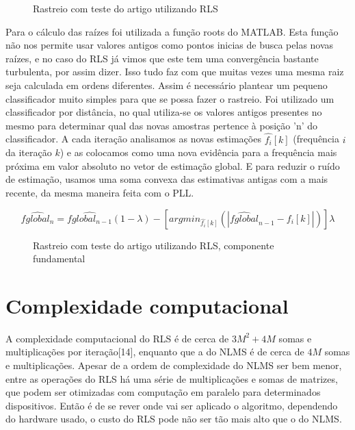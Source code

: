 \begin{figure}[H]
	\centering    
	\def\svgwidth{\columnwidth}
	
	\caption{Rastreio com teste do artigo utilizando RLS}
	\label{fig:rastreio_final}
\end{figure}


Para o cálculo das raízes foi utilizada a função roots do MATLAB. Esta função não nos permite usar valores antigos como pontos inicias de busca pelas novas raízes, e no caso do RLS já vimos que este tem uma convergência bastante turbulenta, por assim dizer. Isso tudo faz com que muitas vezes uma mesma raiz seja calculada em ordens diferentes. Assim é necessário plantear um pequeno classificador muito simples para que se possa fazer o rastreio. Foi utilizado um classificador por distância, no qual utiliza-se os valores antigos presentes no mesmo para determinar qual das novas amostras pertence à posição 'n' do classificador. A cada iteração analisamos as novas estimações $\hat{f_i}[k]$ (frequência $i$ da iteração $k$) e as colocamos como uma nova evidência para a frequência mais próxima em valor absoluto no vetor de estimação global. E para reduzir o ruído de estimação, usamos uma soma convexa das estimativas antigas com a mais recente, da mesma maneira feita com o PLL.

\begin{equation}
	\hat{fglobal_n}=\hat{fglobal_{n-1}}(1-\lambda)-[argmin_{\hat{f_i}[k]}(|\hat{fglobal}_{n-1}-f_i[k]|)]\lambda
\end{equation}

\begin{figure}[H]
	\centering    
	\def\svgwidth{\columnwidth}
	
	\caption{Rastreio com teste do artigo utilizando RLS, componente fundamental}
	\label{fig:rastreio_final}
\end{figure}

\section{Complexidade computacional}

A complexidade computacional do RLS é de cerca de $3M^2 + 4M$ somas e multiplicações por iteração[14], enquanto que a do NLMS é de cerca de $4M$ somas e multiplicações. Apesar de a ordem de complexidade do NLMS ser bem menor, entre as operações do RLS há uma série de multiplicações e somas de matrizes, que podem ser otimizadas com computação em paralelo para determinados dispositivos. Então é de se rever onde vai ser aplicado o algoritmo, dependendo do hardware usado, o custo do RLS pode não ser tão mais alto que o do NLMS.

